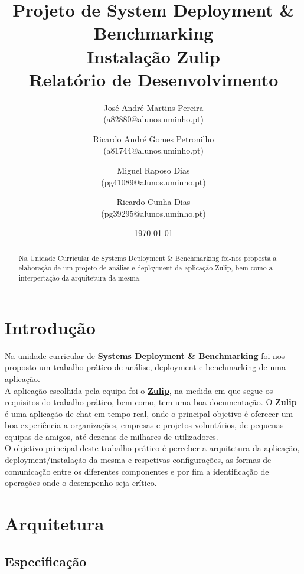 \documentclass[11pt,a4paper]{report}%
\title{Projeto de System Deployment \& Benchmarking\\
       \textbf{Instalação Zulip}\\ Relatório de Desenvolvimento
       } %
\author{José André Martins Pereira\\ (a82880@alunos.uminho.pt) \and Ricardo André Gomes Petronilho\\ (a81744@alunos.uminho.pt) \and Miguel Raposo Dias\\ (pg41089@alunos.uminho.pt) \and
Ricardo Cunha Dias \\ (pg39295@alunos.uminho.pt)
       } %
\date{\today} %
\begin{document}
\maketitle %

\begin{abstract}  %
Na Unidade Curricular de Systems Deployment \& Benchmarking foi-nos proposta a elaboração de um projeto de análise e deployment da aplicação Zulip, bem como a interpertação da arquitetura da mesma.
\end{abstract}

\tableofcontents %

\chapter{Introdução} \label{chap:intro} %
Na unidade curricular de \textbf{Systems Deployment \& Benchmarking} foi-nos proposto um trabalho prático de análise, deployment e benchmarking de uma aplicação.\\

A aplicação escolhida pela equipa foi o \textbf{\href{https://zulipchat.com}{Zulip}}, na medida em que segue os requisitos do trabalho prático, bem como, tem uma boa documentação.
O \textbf{Zulip} é uma aplicação de chat em tempo real, onde o principal objetivo é oferecer um boa experiência a organizações, empresas e projetos voluntários, de pequenas equipas de amigos, até dezenas de milhares de utilizadores.\\

O objetivo principal deste trabalho prático é perceber a arquitetura da aplicação, deployment/instalação da mesma e respetivas configurações, as formas de comunicação entre os diferentes componentes e por fim a identificação de operações onde o desempenho seja crítico.


\chapter{Arquitetura}

\section{Especificação}
\end{document}
